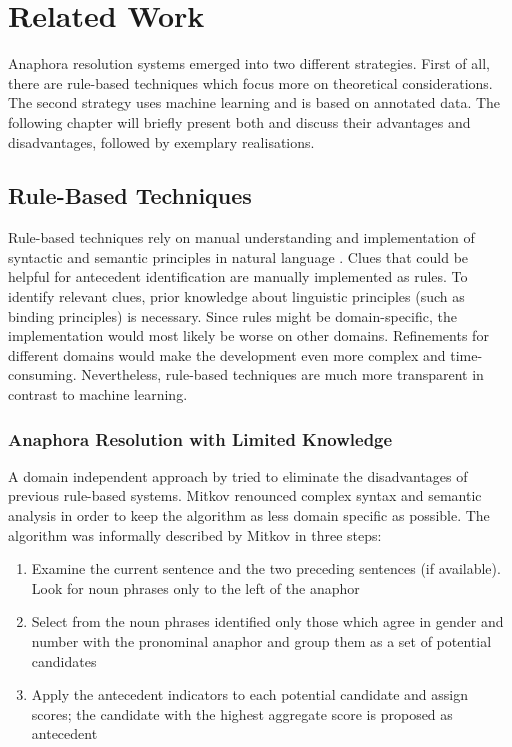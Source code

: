 \chapter{Related Work}
\label{sec:Related Work}

Anaphora resolution systems emerged into two different strategies. First of all, there are rule-based techniques which focus more on theoretical considerations. The second strategy uses machine learning and is based on annotated data. The following chapter will briefly present both and discuss their advantages and disadvantages, followed by exemplary realisations.

\section{Rule-Based Techniques}
Rule-based techniques rely on manual understanding and implementation of syntactic and semantic principles in natural language \citep{kennedy1996anaphora,mitkov1994integrated}. Clues that could be helpful for antecedent  identification are manually implemented as rules. To identify relevant clues, prior knowledge about linguistic principles (such as binding principles) is necessary. Since rules might be domain-specific, the implementation would most likely be worse on other domains. Refinements for different domains would make the development even more complex and time-consuming. Nevertheless, rule-based techniques are much more transparent in contrast to machine learning.

\subsection{Anaphora Resolution with Limited Knowledge}

A domain independent approach by \cite{mitkov1998robust} tried to eliminate the disadvantages of previous rule-based systems. Mitkov renounced complex syntax and semantic analysis in order to keep the algorithm as less domain specific as possible. The algorithm was informally described by Mitkov in three steps:
\begin{enumerate} 
\item Examine the current sentence and the two preceding sentences (if available). Look for noun phrases only to the left of the anaphor
\item Select from the noun phrases identified only those which agree in gender and number with the pronominal anaphor and group them as a set of potential candidates
\item Apply the antecedent indicators to each potential candidate and assign scores; the candidate with the highest aggregate score is proposed as antecedent
\end{enumerate}

